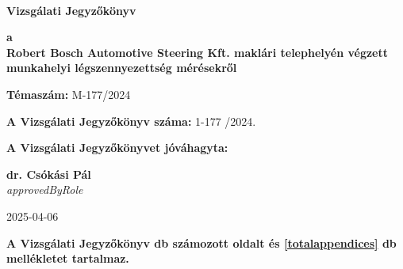 \documentclass[a4paper,12pt]{article}
\begin{document}
	
	
	\thispagestyle{firstpage}
	
	\begin{flushleft}
		{\footnotesize  
			\textbf{
				 \\
				\vspace{-2mm} 
			}
		}
	\end{flushleft}
	
	\vfill
	
	\begin{center}
		{\Huge \textbf{Vizsgálati Jegyzőkönyv}}
	\end{center}
	
	\vfill
	
	\begin{center}
		\large
		\textbf{a} \\
		\textbf{Robert Bosch Automotive Steering Kft. maklári telephelyén
végzett munkahelyi légszennyezettség mérésekről}
	\end{center}
	
	\vfill
	
	\begin{center}
		\textbf{Témaszám:} M-177/2024
	\end{center}    
	
	\vfill
	
	\begin{center}
		\textbf{A Vizsgálati Jegyzőkönyv száma:} 1-177 /2024.
	\end{center}
	
	\begin{center}
		\textbf{A Vizsgálati Jegyzőkönyvet jóváhagyta:}
	\end{center}    
	
	\vfill
	
	\begin{center}
		\textbf{dr. Csókási Pál}\\
		\textit{{{approvedByRole}}} \\
	\end{center}    
	
	\vfill
	
	\begin{center}
		2025-04-06
	\end{center}    
	
	\vfill
	
	\begin{center}
		\textbf{A Vizsgálati Jegyzőkönyv \pageref{LastPage} db számozott oldalt és \ref{totalappendices} db mellékletet tartalmaz.}
	\end{center}    
	
\end{document}
